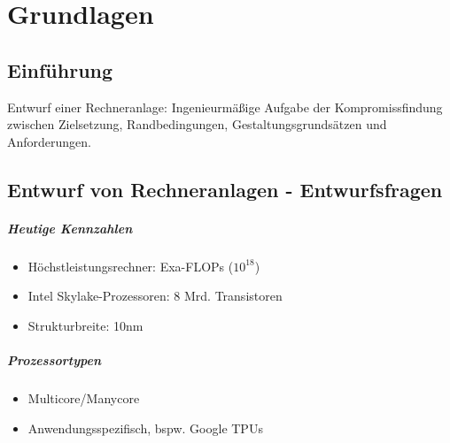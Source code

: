 \chapter{Grundlagen}

\section{Einführung}
	Entwurf einer Rechneranlage: Ingenieurmäßige Aufgabe der Kompromissfindung zwischen Zielsetzung, Randbedingungen, Gestaltungsgrundsätzen und Anforderungen.

\section{Entwurf von Rechneranlagen - Entwurfsfragen}
	\paragraph{Heutige Kennzahlen}
		\begin{itemize}
			\item Höchstleistungsrechner: Exa-FLOPs ($10^{18}$)
			\item Intel Skylake-Prozessoren: 8 Mrd. Transistoren
			\item Strukturbreite: 10nm 
		\end{itemize}

	\paragraph{Prozessortypen}
		\begin{itemize}
			\item Multicore/Manycore
			\item Anwendungsspezifisch, bspw. Google TPUs 
		\end{itemize}

